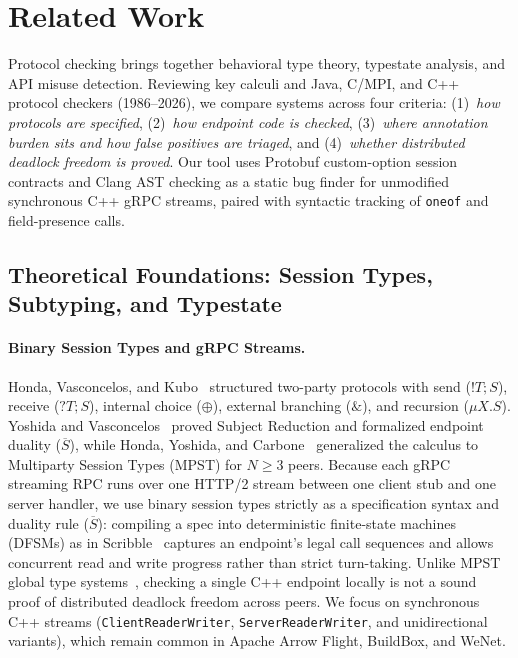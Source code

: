 \section{Related Work}
\label{ch:related-work}

Protocol checking brings together behavioral type theory, typestate analysis, and API misuse detection. Reviewing key calculi and Java, C/MPI, and C++ protocol checkers (1986--2026), we compare systems across four criteria: (1)~\emph{how protocols are specified}, (2)~\emph{how endpoint code is checked}, (3)~\emph{where annotation burden sits and how false positives are triaged}, and (4)~\emph{whether distributed deadlock freedom is proved}. Our tool uses Protobuf custom-option session contracts and Clang AST checking as a static bug finder for unmodified synchronous C++ gRPC streams, paired with syntactic tracking of \texttt{oneof} and field-presence calls.

\subsection{Theoretical Foundations: Session Types, Subtyping, and Typestate}
\label{sec:rw-foundations}

\paragraph{Binary Session Types and gRPC Streams.}
Honda, Vasconcelos, and Kubo~\cite{honda-v-k-1998} structured two-party protocols with send ($!T; S$), receive ($?T; S$), internal choice ($\oplus$), external branching ($\&$), and recursion ($\mu X. S$). Yoshida and Vasconcelos~\cite{yoshida-vasconcelos-2007} proved Subject Reduction and formalized endpoint duality ($\overline{S}$), while Honda, Yoshida, and Carbone~\cite{honda-yoshida-carbone-2008} generalized the calculus to Multiparty Session Types (MPST) for $N \ge 3$ peers. Because each gRPC streaming RPC runs over one HTTP/2 stream between one client stub and one server handler, we use binary session types strictly as a specification syntax and duality rule ($\overline{S}$): compiling a spec into deterministic finite-state machines (DFSMs) as in Scribble~\cite{honda-et-al-2011} captures an endpoint's legal call sequences and allows concurrent read and write progress rather than strict turn-taking. Unlike MPST global type systems~\cite{honda-yoshida-carbone-2008}, checking a single C++ endpoint locally is not a sound proof of distributed deadlock freedom across peers. We focus on synchronous C++ streams (\texttt{ClientReaderWriter}, \texttt{ServerReaderWriter}, and unidirectional variants), which remain common in Apache Arrow Flight, BuildBox, and WeNet.

